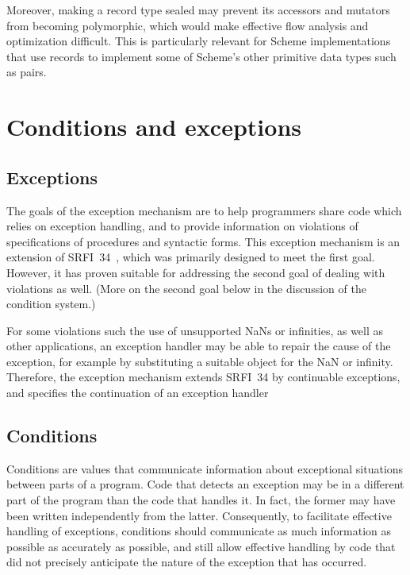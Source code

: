 \documentclass[twoside,twocolumn]{algol60}
\begin{document}
Moreover, making a record type sealed may prevent its accessors and
mutators from becoming polymorphic, which would make effective flow analysis and
optimization difficult.  This is particularly relevant for
Scheme implementations that use records to implement some of Scheme's
other primitive data types such as pairs.

\chapter{Conditions and exceptions}

\section{Exceptions}

The goals of the exception mechanism are to help programmers share
code which relies on exception handling, and to provide information on
violations of specifications of procedures and syntactic forms.  This
exception mechanism is an extension of SRFI~34~\cite{srfi34}, which
was primarily designed to meet the first goal.  However, it has proven
suitable for addressing the second goal of dealing with violations as
well.   (More on the second goal below in the discussion of the
condition system.)

For some violations such the use of unsupported NaNs or infinities, as
well as other applications, an exception handler may be able to
repair the cause of the exception, for example by substituting a
suitable object for the NaN or infinity.  Therefore, the exception
mechanism extends SRFI~34 by continuable exceptions, and specifies the
continuation of an exception handler

\section{Conditions}

Conditions are values that communicate information about exceptional
situations between parts of a program. Code that detects an exception
may be in a different part of the program than the code that handles
it. In fact, the former may have been written independently from the
latter.  Consequently, to facilitate effective handling of exceptions,
conditions should communicate as much information as possible as
accurately as possible, and still allow effective handling by code
that did not precisely anticipate the nature of the exception that has
occurred.
\end{document}
